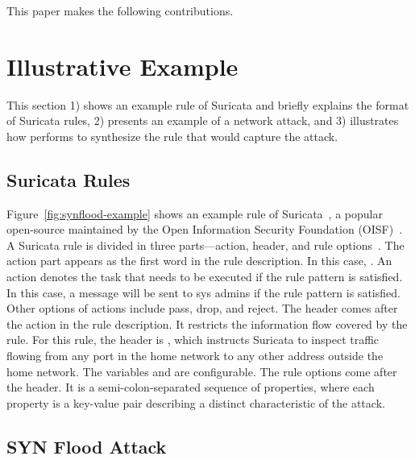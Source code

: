 \documentclass[conference]{IEEEtran}
\begin{document}


This paper makes the following contributions. 

\section{Illustrative Example}
\label{sec:suri-metas-coverage}

This section 1) shows an example rule of Suricata and briefly explains
the format of Suricata rules, 2) presents an example of
a network attack, and 3) illustrates how \tname{} performs to
synthesize the rule that would capture the attack.

\subsection{Suricata Rules}

Figure~\ref{fig:synflood-example} shows an example rule of
Suricata~\cite{suricata}, a popular open-source \nids{} maintained by
the Open Information Security Foundation (OISF)~\cite{oisf}. A
Suricata rule is divided in three parts---action, header, and rule
options~\cite{suri-rule-format}. The action part appears as the first
word in the rule description. In this case, . An action
denotes the task that needs to be executed if the rule pattern is
satisfied. In this case, a message will be sent to sys admins if the
rule pattern is satisfied. Other options of actions include pass,
drop, and reject. The header comes after the action in the rule
description. It restricts the information flow covered by the
rule. For this rule, the header is , which instructs Suricata to inspect
 traffic flowing from any port in the home network to any
other address outside the home network. The variables
 and  are
configurable. The rule options come after the header. It is a
semi-colon-separated sequence of properties, where each property is a key-value pair
describing a distinct characteristic of the attack.

\subsection{SYN Flood Attack}
\end{document}
